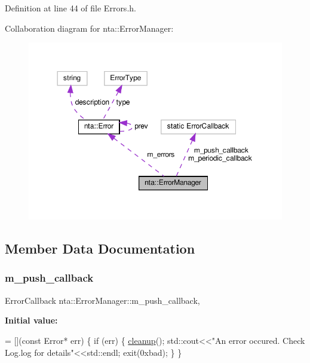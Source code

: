 Definition at line 44 of file Errors.\+h.



Collaboration diagram for nta\+:\+:Error\+Manager\+:
\nopagebreak
\begin{figure}[H]
\begin{center}
\leavevmode
\includegraphics[width=350pt]{d5/d79/classnta_1_1ErrorManager__coll__graph}
\end{center}
\end{figure}


\subsection{Member Data Documentation}
\mbox{\label{classnta_1_1ErrorManager_a96ac1ed4fb4ee3dd2ca4c055ccfc630c}} 
\subsubsection{\texorpdfstring{m\+\_\+push\+\_\+callback}{m\_push\_callback}}
{\footnotesize\ttfamily Error\+Callback nta\+::\+Error\+Manager\+::m\+\_\+push\+\_\+callback\hspace{0.3cm}{\ttfamily [static]}, {\ttfamily [private]}}

{\bfseries Initial value\+:}
\begin{DoxyCode}
= [](\textcolor{keyword}{const} Error* err) \{
        \textcolor{keywordflow}{if} (err) \{
            \hyperlink{namespacenta_a17dc16b021d0dec3749e422b95d39350}{cleanup}();
            std::cout<<\textcolor{stringliteral}{"An error occured. Check Log.log for details"}<<std::endl;
            exit(0xbad);
        \}
    \}
\end{DoxyCode}


